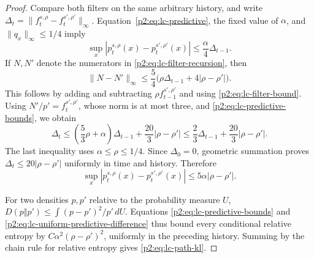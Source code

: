 \documentclass[11pt,a4paper]{article}
\theoremstyle{definition}
\theoremstyle{remark}
\numberwithin{equation}{section}
\begin{document}
\begin{proof}
Compare both filters on the same arbitrary history, and write
$\Delta_t=\|f_t^{s,\rho}-f_t^{s',\rho'}\|_\infty$.
Equation~\eqref{p2:eq:lc-predictive}, the fixed value of $\alpha$, and
$\|q_x\|_\infty\le1/4$ imply
\begin{equation}\label{p2:eq:lc-predictive-difference}
 \sup_x|p_t^{s,\rho}(x)-p_t^{s',\rho'}(x)|
       \le\frac\alpha4\Delta_{t-1}.
\end{equation}
If $N,N'$ denote the numerators in
\eqref{p2:eq:lc-filter-recursion}, then
\[
 \|N-N'\|_\infty
 \le\frac54\bigl(\rho\Delta_{t-1}+4|\rho-\rho'|\bigr).
\]
This follows by adding and subtracting $\rho f_{t-1}^{s',\rho'}$
and using \eqref{p2:eq:lc-filter-bound}.
Using $N'/p'=f_t^{s',\rho'}$, whose norm is at most three, and
\eqref{p2:eq:lc-predictive-bounds}, we obtain
\[
 \Delta_t
 \le\left(\frac53\rho+\alpha\right)\Delta_{t-1}
                         +\frac{20}{3}|\rho-\rho'|
 \le\frac23\Delta_{t-1}+\frac{20}{3}|\rho-\rho'|.
\]
The last inequality uses $\alpha\le\rho\le1/4$.
Since $\Delta_0=0$, geometric summation proves
$\Delta_t\le20|\rho-\rho'|$ uniformly in time and history.  Therefore
\begin{equation}\label{p2:eq:lc-uniform-predictive-difference}
 \sup_x|p_t^{s,\rho}(x)-p_t^{s',\rho'}(x)|
       \le5\alpha|\rho-\rho'|.
\end{equation}

For two densities $p,p'$ relative to the probability measure $U$,
$D(p\Vert p')\le\int(p-p')^2/p'\,dU$.  Equations
\eqref{p2:eq:lc-predictive-bounds} and
\eqref{p2:eq:lc-uniform-predictive-difference} thus bound every conditional
relative entropy by $C\alpha^2(\rho-\rho')^2$, uniformly in the preceding
history.  Summing by the chain rule for relative entropy gives
\eqref{p2:eq:lc-path-kl}.
\end{proof}
\end{document}
